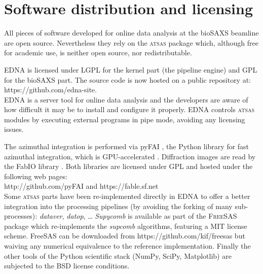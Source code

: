 \documentclass[preprint,pdf]{iucr}              %
\begin{document}
\section{Software distribution and licensing}

All pieces of software developed for online data analysis at the bioSAXS
beamline are open source.
Nevertheless they rely on the \textsc{atsas} package which, although free
for academic use, is neither open source, nor redistributable.

EDNA is licensed under LGPL for the kernel part (the pipeline engine) and GPL
for the bioSAXS part. The source code is now hosted on a public
repository at:\\
https://github.com/edna-site.\\
EDNA is a server tool for online data analysis and the developers are aware of
how difficult it may be to install and configure it properly. EDNA controls
\textsc{atsas} modules by executing external programs in pipe mode, avoiding
any licensing issues.

The azimuthal integration is performed via pyFAI \cite{pyFAI}, the Python library
for fast azimuthal integration, which is GPU-accelerated \cite{pyFAI_2015}.
Diffraction images are read by the FabIO library \cite{fabio}.
Both libraries are licensed under GPL and hosted under the following web
pages:\\
http://github.com/pyFAI and https://fable.sf.net\\
Some \textsc{atsas} parts have been re-implemented  directly in EDNA  
to offer a better integration into the processing pipelines (by avoiding the
forking of many sub-processes): \textit{dataver}, \textit{datop}, \ldots 
\textit{Supycomb} is available as part of the \textsc{FreeSAS} package which
re-implements the \textit{supcomb} algorithms, featuring a MIT license scheme. 
FreeSAS can be downloaded from
https://github.com/kif/freesas but waiving any numerical equivalence to the
reference implementation.
Finally the other tools of the Python scientific stack (NumPy, SciPy,
Matplotlib) are subjected to the BSD license conditions.
\end{document}
